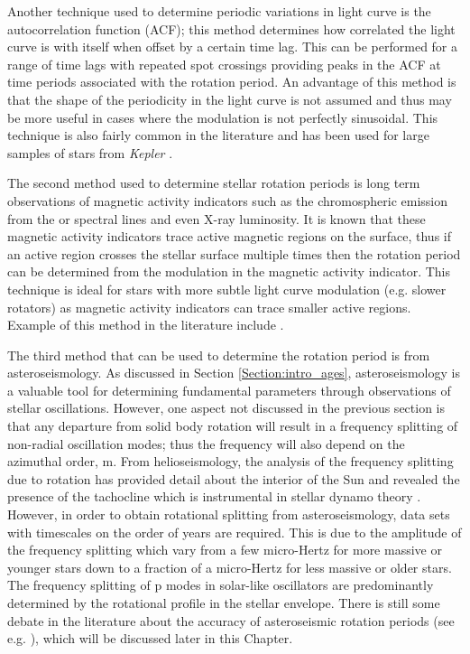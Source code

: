Another technique used to determine periodic variations in light curve is the autocorrelation function (ACF); this method determines how correlated the light curve is with itself when offset by a certain time lag. This can be performed for a range of time lags with repeated spot crossings providing peaks in the ACF at time periods associated with the rotation period. An advantage of this method is that the shape of the periodicity in the light curve is not assumed and thus may be more useful in cases where the modulation is not perfectly sinusoidal. This technique is also fairly common in the literature and has been used for large samples of stars from \textit{Kepler} \citep{McQuillan_etal_2014}.

The second method used to determine stellar rotation periods is long term observations of magnetic activity indicators such as the chromospheric emission from the \caII or \Halpha spectral lines and even X-ray luminosity. It is known that these magnetic activity indicators trace active magnetic regions on the surface, thus if an active region crosses the stellar surface multiple times then the rotation period can be determined from the modulation in the magnetic activity indicator. This technique is ideal for stars with more subtle light curve modulation (e.g. slower rotators) as magnetic activity indicators can trace smaller active regions. Example of this method in the literature include \citet{Boro_Saikia_etal_2016,Robertson_etal_2015_GJ176,DeWarf_etal_2010}.

The third method that can be used to determine the rotation period is from asteroseismology. As discussed in Section \ref{Section:intro_ages}, asteroseismology is a valuable tool for determining fundamental parameters through observations of stellar oscillations. However, one aspect not discussed in the previous section is that any departure from solid body rotation will result in a frequency splitting of non-radial oscillation modes; thus the frequency will also depend on the azimuthal order, m. From helioseismology, the analysis of the frequency splitting due to rotation has provided detail about the interior of the Sun and revealed the presence of the tachocline \citep{Spiegel_Zahn_1992} which is instrumental in stellar dynamo theory . However, in order to obtain rotational splitting from asteroseismology, data sets with timescales on the order of years are required. This is due to the amplitude of the frequency splitting which vary from a few micro-Hertz for more massive or younger stars down to a fraction of a micro-Hertz for less massive or older stars. The frequency splitting of p modes in solar-like oscillators are predominantly determined by the rotational profile in the stellar envelope. There is still some debate in the literature about the accuracy of asteroseismic rotation periods (see e.g. \citealt{Barnes_etal_2016_aspect_gyro}), which will be discussed later in this Chapter.

